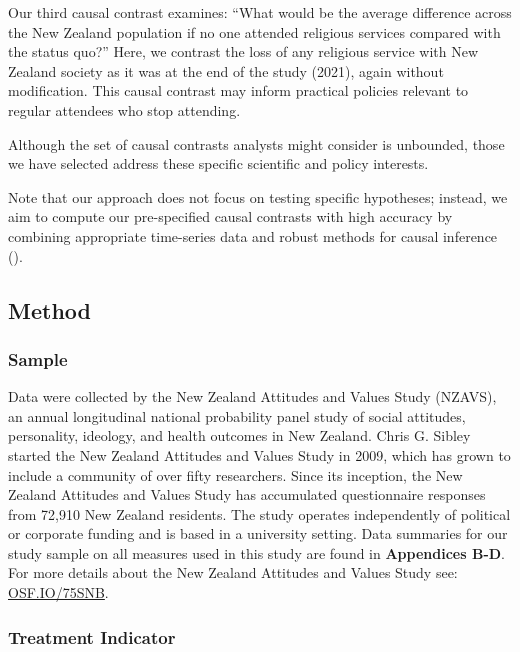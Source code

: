 \documentclass[
  single column]{article}
\begin{document}
Our third causal contrast examines: ``What would be the average
difference across the New Zealand population if no one attended
religious services compared with the status quo?'' Here, we contrast the
loss of any religious service with New Zealand society as it was at the
end of the study (2021), again without modification. This causal
contrast may inform practical policies relevant to regular attendees who
stop attending.

Although the set of causal contrasts analysts might consider is
unbounded, those we have selected address these specific scientific and
policy interests.

Note that our approach does not focus on testing specific hypotheses;
instead, we aim to compute our pre-specified causal contrasts with high
accuracy by combining appropriate time-series data and robust methods
for causal inference ().

\subsection{Method}\label{method}

\subsubsection{Sample}\label{sample}

Data were collected by the New Zealand Attitudes and Values Study
(NZAVS), an annual longitudinal national probability panel study of
social attitudes, personality, ideology, and health outcomes in New
Zealand. Chris G. Sibley started the New Zealand Attitudes and Values
Study in 2009, which has grown to include a community of over fifty
researchers. Since its inception, the New Zealand Attitudes and Values
Study has accumulated questionnaire responses from 72,910 New Zealand
residents. The study operates independently of political or corporate
funding and is based in a university setting. Data summaries for our
study sample on all measures used in this study are found in
\textbf{Appendices B-D}. For more details about the New Zealand
Attitudes and Values Study see:
\href{https://doi.org/10.17605/OSF.IO/75SNB}{OSF.IO/75SNB}.

\subsubsection{Treatment Indicator}\label{treatment-indicator}
\end{document}
